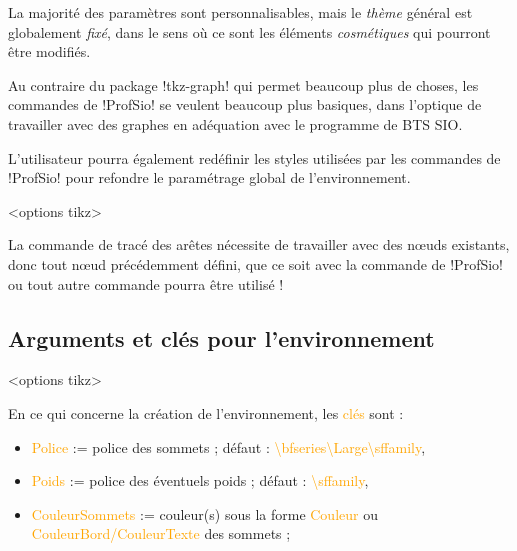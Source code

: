 \documentclass[french,a4paper,11pt]{article}
\newcommand\Cle[1]{{\small\sffamily\textlangle \textcolor{orange}{#1}\textrangle}}
\begin{document}
{\begin{warningblock}
La majorité des paramètres sont personnalisables, mais le \textit{thème} général est globalement \textit{fixé}, dans le sens où ce sont les éléments \textit{cosmétiques} qui pourront être modifiés.

\smallskip

Au contraire du package \packagetex!tkz-graph! qui permet beaucoup plus de choses, les commandes de \packagetex!ProfSio! se veulent beaucoup plus basiques, dans l'optique de travailler avec des graphes en adéquation avec le programme de BTS SIO.
\end{warningblock}

\begin{noteblock}
L'utilisateur pourra également redéfinir les styles utilisées par les commandes de \packagetex!ProfSio! pour refondre le paramétrage global de l'environnement.
\end{noteblock}

\begin{DemoCode}
\begin{GrapheTikz}[clés]<options tikz>
\end{GrapheTikz}
\end{DemoCode}

\begin{tipblock}
La commande de tracé des arêtes nécessite de travailler avec des nœuds existants, donc tout nœud précédemment défini, que ce soit avec la commande de \packagetex!ProfSio! ou tout autre commande pourra être utilisé !
\end{tipblock}

\subsection{Arguments et clés pour l'environnement}

\begin{DemoCode}
\begin{GrapheTikz}[clés]<options tikz>
\end{GrapheTikz}
\end{DemoCode}

\begin{tipblock}
En ce qui concerne la création de l'environnement, les \Cle{clés} sont :

\begin{itemize}
	\item \Cle{Police} := police des sommets ; \hfill{}défaut : \Cle{\textbackslash bfseries\textbackslash Large\textbackslash sffamily},%
	\item \Cle{Poids} := police des éventuels poids ; \hfill{}défaut : \Cle{\textbackslash sffamily},%
	\item \Cle{CouleurSommets} := couleur(s) sous la forme \Cle{Couleur} ou \Cle{CouleurBord/CouleurTexte} des sommets ;
	

\end{itemize}
\end{tipblock}}
\end{document}
